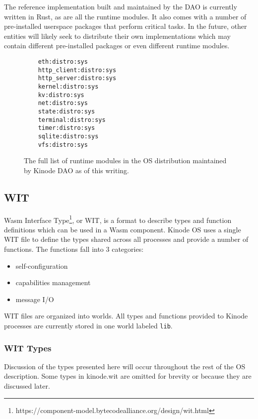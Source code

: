 \documentclass[runningheads]{llncs}
\begin{document}
The reference implementation built and maintained by the DAO is currently written in Rust, as are all the runtime modules.
It also comes with a number of pre-installed userspace packages that perform critical tasks.
In the future, other entities will likely seek to distribute their own implementations which may contain different pre-installed packages or even different runtime modules.

\begin{figure}
    \centering
    \begin{lstlisting}
    eth:distro:sys
    http_client:distro:sys
    http_server:distro:sys
    kernel:distro:sys
    kv:distro:sys
    net:distro:sys
    state:distro:sys
    terminal:distro:sys
    timer:distro:sys
    sqlite:distro:sys
    vfs:distro:sys
    \end{lstlisting}
    \caption{The full list of runtime modules in the OS distribution maintained by Kinode DAO as of this writing.}
    \label{fig:runtime modules list}
\end{figure}

\subsection{WIT}

Wasm Interface Type\footnote{https://component-model.bytecodealliance.org/design/wit.html}, or WIT, is a format to describe types and function definitions which can be used in a Wasm component.
Kinode OS uses a single WIT file to define the types shared across all processes and provide a number of functions.
The functions fall into 3 categories:
\begin{itemize}
    \item self-configuration
    \item capabilities management
    \item message I/O
\end{itemize}

WIT files are organized into worlds. All types and functions provided to Kinode processes are currently stored in one world labeled \verb|lib|.

\subsubsection{WIT Types}

Discussion of the types presented here will occur throughout the rest of the OS description.
Some types in kinode.wit are omitted for brevity or because they are discussed later.
\end{document}
